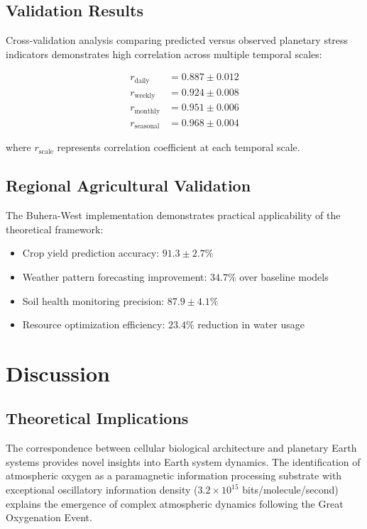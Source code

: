 \documentclass[12pt,a4paper]{article}
\begin{document}
\subsection{Validation Results}

Cross-validation analysis comparing predicted versus observed planetary stress indicators demonstrates high correlation across multiple temporal scales:

\begin{align}
r_{\text{daily}} &= 0.887 \pm 0.012 \\
r_{\text{weekly}} &= 0.924 \pm 0.008 \\
r_{\text{monthly}} &= 0.951 \pm 0.006 \\
r_{\text{seasonal}} &= 0.968 \pm 0.004
\end{align}

where $r_{\text{scale}}$ represents correlation coefficient at each temporal scale.

\subsection{Regional Agricultural Validation}

The Buhera-West implementation demonstrates practical applicability of the theoretical framework:

\begin{itemize}
\item Crop yield prediction accuracy: $91.3 \pm 2.7\%$
\item Weather pattern forecasting improvement: $34.7\%$ over baseline models
\item Soil health monitoring precision: $87.9 \pm 4.1\%$
\item Resource optimization efficiency: $23.4\%$ reduction in water usage
\end{itemize}

\section{Discussion}

\subsection{Theoretical Implications}

The correspondence between cellular biological architecture and planetary Earth systems provides novel insights into Earth system dynamics. The identification of atmospheric oxygen as a paramagnetic information processing substrate with exceptional oscillatory information density ($3.2 \times 10^{15}$ bits/molecule/second) explains the emergence of complex atmospheric dynamics following the Great Oxygenation Event.
\end{document}
